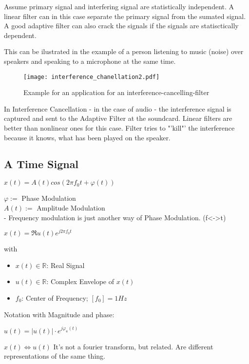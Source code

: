 Assume primary signal and interfering signal are statistically independent. A linear filter can in this case separate the primary signal from the sumated signal. A good adaptive filter can also crack the signals if the signals are statisctically dependent. 

This can be ilustrated in the example of a person listening to music (noise) over speakers and speaking to a microphone at the same time. 

\begin{figure}[H]
	\centering
	\texttt{[image: interference\_chanellation2.pdf]}
	\caption{Example for an application for an interference-cancelling-filter}
	\label{interference2} 
\end{figure}

In Interference Cancellation - in the case of audio - the interference signal is captured and sent to the Adaptive Filter at the soundcard. Linear filters are better than nonlinear ones for this case. Filter tries to "'kill"' the interference because it knows, what has been played on the speaker.


\subsection{A Time Signal}
\null\qquad $x(t) = A(t)  cos(2  \pi  f_0  t + \varphi(t))$

\null\qquad $\varphi:=$ Phase Modulation\\
\null\qquad $A(t):=   $ Amplitude Modulation\\

- Frequency modulation is just another way of Phase Modulation. (f<->t)

\null\qquad $x(t) = \Re{u(t)  e^{j 2  \pi  f_0  t}}$

with   
\begin{itemize}
	\item $x(t)\in \mathbb{R}$: Real Signal
	\item $u(t)\in \mathbb{R}$: Complex Envelope of $x(t)$
	\item $f_0$: Center of Frequency; \quad $[f_0]=1 Hz$
\end{itemize}

Notation with Magnitude and phase:

\null\qquad $u(t)=|u(t)|\cdot e^{j\varphi_u(t)}$

\null\qquad $x(t) \iff u(t)$ 
\null\qquad\pfeil It's not a fourier transform, but related. Are different representations of the same thing. 


